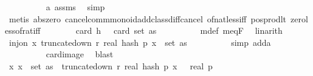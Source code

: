 \begin{isabellebody}
\ \ \ \ \ \ \ \ \isamarkupfalse%
\ a\ assms{\isacharparenleft}{\kern0pt}{}{\isacharparenright}{\kern0pt}\ \isamarkupfalse%
\ simp\ \isanewline
\ \ \ \ \ \ \ \ \isamarkupfalse%
\ {\isacharparenleft}{\kern0pt}metis\ abs{\isacharunderscore}{\kern0pt}zero\ cancel{\isacharunderscore}{\kern0pt}comm{\isacharunderscore}{\kern0pt}monoid{\isacharunderscore}{\kern0pt}add{\isacharunderscore}{\kern0pt}class{\isachardot}{\kern0pt}diff{\isacharunderscore}{\kern0pt}cancel\ of{\isacharunderscore}{\kern0pt}nat{\isacharunderscore}{\kern0pt}less{\isacharunderscore}{\kern0pt}{}{\isacharunderscore}{\kern0pt}iff\ pos{\isacharunderscore}{\kern0pt}prod{\isacharunderscore}{\kern0pt}lt\ zero{\isacharunderscore}{\kern0pt}less{\isacharunderscore}{\kern0pt}of{\isacharunderscore}{\kern0pt}rat{\isacharunderscore}{\kern0pt}iff{\isacharparenright}{\kern0pt}\isanewline
\ \ \ \ \ \ \isamarkupfalse%
\ {\isachardoublequoteopen}card\ {\isacharparenleft}{\kern0pt}h\ {\isasymomega}{\isacharparenright}{\kern0pt}\ {\isasymnoteq}\ card\ {\isacharparenleft}{\kern0pt}set\ as{\isacharparenright}{\kern0pt}{\isachardoublequoteclose}\isanewline
\ \ \ \ \ \ \ \ \isamarkupfalse%
\ m{\isacharunderscore}{\kern0pt}def\ m{\isacharunderscore}{\kern0pt}eq{\isacharunderscore}{\kern0pt}F{\isacharunderscore}{\kern0pt}{}\ \isamarkupfalse%
\ linarith\isanewline
\ \ \ \ \ \ \isamarkupfalse%
\ {\isachardoublequoteopen}{\isasymnot}inj{\isacharunderscore}{\kern0pt}on\ {\isacharparenleft}{\kern0pt}{\isasymlambda}x{\isachardot}{\kern0pt}\ truncate{\isacharunderscore}{\kern0pt}down\ r\ {\isacharparenleft}{\kern0pt}real\ {\isacharparenleft}{\kern0pt}hash\ p\ x\ {\isasymomega}{\isacharparenright}{\kern0pt}{\isacharparenright}{\kern0pt}{\isacharparenright}{\kern0pt}\ {\isacharparenleft}{\kern0pt}set\ as{\isacharparenright}{\kern0pt}{\isachardoublequoteclose}\isanewline
\ \ \ \ \ \ \ \ \isamarkupfalse%
\ {\isacharparenleft}{\kern0pt}simp\ add{\isacharcolon}{\kern0pt}a{\isacharunderscore}{\kern0pt}{}{\isacharparenright}{\kern0pt}\ \isanewline
\ \ \ \ \ \ \ \ \isamarkupfalse%
\ card{\isacharunderscore}{\kern0pt}image\ \isamarkupfalse%
\ blast\isanewline
\ \ \ \ \ \ \isamarkupfalse%
\ \isamarkupfalse%
\ {\isachardoublequoteopen}{\isasymAnd}x{\isachardot}{\kern0pt}\ x\ {\isasymin}\ set\ as\ {\isasymLongrightarrow}\ truncate{\isacharunderscore}{\kern0pt}down\ r\ {\isacharparenleft}{\kern0pt}real\ {\isacharparenleft}{\kern0pt}hash\ p\ x\ {\isasymomega}{\isacharparenright}{\kern0pt}{\isacharparenright}{\kern0pt}\ {\isasymle}\ real\ p{\isachardoublequoteclose}\isanewline

\end{isabellebody}
